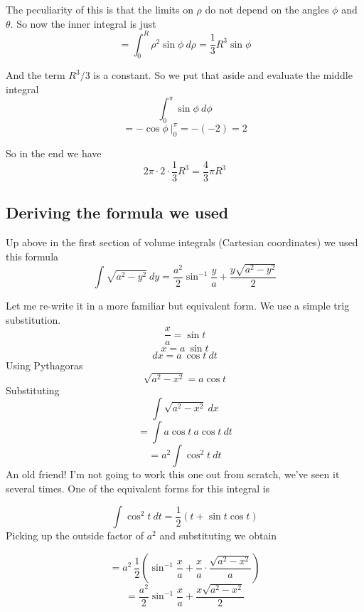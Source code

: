 \documentclass[11pt, oneside]{article}
\begin{document}
The peculiarity of this is that the limits on $\rho$ do not depend on the angles $\phi$ and $\theta$.  So now the inner integral is just 
\[ = \int_0^R \rho^2 \sin \phi \ d \rho = \frac{1}{3}R^3 \sin \phi \]

And the term $R^3/3$ is a constant.  So we put that aside and evaluate the middle integral
\[ \int_0^{\pi} \sin \phi \ d \phi \]
\[ = - \cos \phi \ \bigg |_0^{\pi} = - (- 2) = 2\]

So in the end we have 
\[ 2 \pi \cdot 2 \cdot \frac{1}{3}R^3 = \frac{4}{3} \pi R^3 \]

\subsection*{Deriving the formula we used}
Up above in the first section of volume integrals (Cartesian coordinates) we used this formula
\[ \int \sqrt{a^2 - y^2} \ dy = \frac{a^2}{2} \sin^{-1} \frac{y}{a} + \frac{y \sqrt{a^2-y^2}}{2} \]

Let me re-write it in a more familiar but equivalent form.  We use a simple trig substitution.
\[ \frac{x}{a} = \sin t \]
\[ x = a \ \sin t \]
\[ dx = a \ \cos t \ dt \]
Using Pythagoras
\[ \sqrt{a^2 - x^2} = a \cos t \]
Substituting
\[ \int \sqrt{a^2 - x^2} \ dx \]
\[ = \int  a \cos t \ a \cos t \ dt \] 
\[ = a^2 \int  \cos^2 t \ dt \]
An old friend!  I'm not going to work this one out from scratch, we've seen it several times.  One of the equivalent forms for this integral is

\[ \int \cos^2 t \ dt = \frac{1}{2}(t + \sin t \cos t) \]
Picking up the outside factor of $a^2$ and substituting we obtain

\[ = a^2 \ \frac{1}{2} (\sin^{-1}\frac{x}{a} + \frac{x}{a} \cdot \frac{\sqrt{a^2-x^2}}{a} ) \]
\[ = \frac{a^2}{2} \sin^{-1} \frac{x}{a} + \frac{x \sqrt{a^2-x^2}}{2} \]
\end{document}
